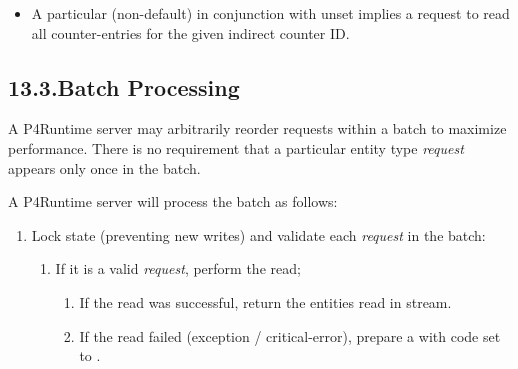 \documentclass[11pt]{article}
\begin{document}
{\begin{itemize}[noitemsep,topsep=\mdcompacttopsep]
\item{}A particular (non-default)  in conjunction with  unset
implies a request to read all counter-entries for the given indirect counter
ID.%
\end{itemize}%

\subsection{13.3.\hspace*{0.5em}Batch Processing}\label{sec-batch-processing}%

\noindent{}A P4Runtime server may arbitrarily reorder requests within a batch to maximize
performance. There is no requirement that a particular entity type \emph{request}
appears only once in the batch.%

A P4Runtime server will process the batch as follows:%

\begin{enumerate}%

\item{}
Lock state (preventing new writes) and validate each \emph{request} in the batch:%

\begin{enumerate}%

\item{}
If it is a valid \emph{request}, perform the read;%

\begin{enumerate}[noitemsep,topsep=\mdcompacttopsep]%

\item{}If the read was successful, return the entities read in
 stream.%

\item{}If the read failed (exception / critical-error), prepare a 
with code set to .%
\end{enumerate}%


\end{enumerate}
\end{enumerate}}
\end{document}
